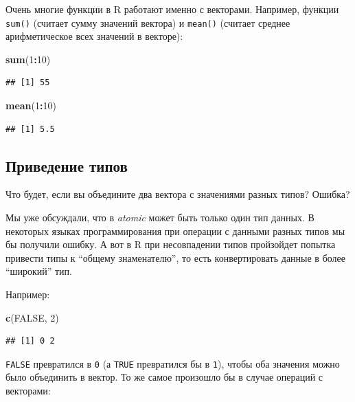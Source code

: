 \documentclass[]{book}
\newenvironment{Shaded}{\begin{snugshade}}{\end{snugshade}}
\newcommand{\KeywordTok}[1]{\textcolor[rgb]{0.13,0.29,0.53}{\textbf{#1}}}
\newcommand{\DecValTok}[1]{\textcolor[rgb]{0.00,0.00,0.81}{#1}}
\newcommand{\OtherTok}[1]{\textcolor[rgb]{0.56,0.35,0.01}{#1}}
\newcommand{\OperatorTok}[1]{\textcolor[rgb]{0.81,0.36,0.00}{\textbf{#1}}}
\newcommand{\NormalTok}[1]{#1}
\begin{document}
Очень многие функции в R работают именно с векторами. Например, функции
\texttt{sum()} (считает сумму значений вектора) и \texttt{mean()}
(считает среднее арифметическое всех значений в векторе):

\begin{Shaded}
\begin{Highlighting}[]
\KeywordTok{sum}\NormalTok{(}\DecValTok{1}\OperatorTok{:}\DecValTok{10}\NormalTok{)}
\end{Highlighting}
\end{Shaded}

\begin{verbatim}
## [1] 55
\end{verbatim}

\begin{Shaded}
\begin{Highlighting}[]
\KeywordTok{mean}\NormalTok{(}\DecValTok{1}\OperatorTok{:}\DecValTok{10}\NormalTok{)}
\end{Highlighting}
\end{Shaded}

\begin{verbatim}
## [1] 5.5
\end{verbatim}

\subsection{Приведение типов}\label{coercion}

Что будет, если вы объедините два вектора с значениями разных типов?
Ошибка?

Мы уже обсуждали, что в \emph{atomic} может быть только один тип данных.
В некоторых языках программирования при операции с данными разных типов
мы бы получили ошибку. А вот в R при несовпадении типов пройзойдет
попытка привести типы к ``общему знаменателю'', то есть конвертировать
данные в более ``широкий'' тип.

Например:

\begin{Shaded}
\begin{Highlighting}[]
\KeywordTok{c}\NormalTok{(}\OtherTok{FALSE}\NormalTok{, }\DecValTok{2}\NormalTok{)}
\end{Highlighting}
\end{Shaded}

\begin{verbatim}
## [1] 0 2
\end{verbatim}

\texttt{FALSE} превратился в \texttt{0} (а \texttt{TRUE} превратился бы
в \texttt{1}), чтобы оба значения можно было объединить в вектор. То же
самое произошло бы в случае операций с векторами:
\end{document}
